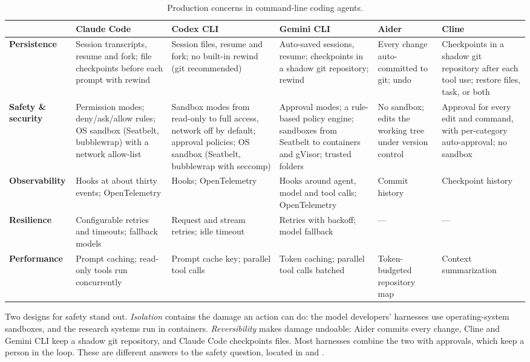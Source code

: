 \begin{table}[t]
\centering
\scriptsize
\setlength{\tabcolsep}{3pt}
\renewcommand{\arraystretch}{1.15}
\caption{Production concerns in command-line coding agents.}
\label{tab:concerns-cli}
\begin{tabularx}{\linewidth}{@{}>{\bfseries}p{1.95cm}YYYYY@{}}
\toprule
& Claude Code & Codex CLI & Gemini CLI & Aider & Cline \\
\midrule
Persistence & Session transcripts, resume and fork; file checkpoints before each prompt with rewind & Session files, resume and fork; no built-in rewind (git recommended) & Auto-saved sessions, resume; checkpoints in a shadow git repository; rewind & Every change auto-committed to git; undo & Checkpoints in a shadow git repository after each tool use; restore files, task, or both \\
Safety \& security & Permission modes; deny/ask/allow rules; OS sandbox (Seatbelt, bubblewrap) with a network allow-list & Sandbox modes from read-only to full access, network off by default; approval policies; OS sandbox (Seatbelt, bubblewrap with seccomp) & Approval modes; a rule-based policy engine; sandboxes from Seatbelt to containers and gVisor; trusted folders & No sandbox; edits the working tree under version control & Approval for every edit and command, with per-category auto-approval; no sandbox \\
Observability & Hooks at about thirty events; OpenTelemetry & Hooks; OpenTelemetry & Hooks around agent, model and tool calls; OpenTelemetry & Commit history & Checkpoint history \\
Resilience & Configurable retries and timeouts; fallback models & Request and stream retries; idle timeout & Retries with backoff; model fallback & --- & --- \\
Performance & Prompt caching; read-only tools run concurrently & Prompt cache key; parallel tool calls & Token caching; parallel tool calls batched & Token-budgeted repository map & Context summarization \\
\bottomrule
\end{tabularx}
\end{table}

Two designs for safety stand out. \emph{Isolation} contains the damage an action can do: the model developers' harnesses use operating-system sandboxes, and the research systems run in containers. \emph{Reversibility} makes damage undoable: Aider commits every change, Cline and Gemini CLI keep a shadow git repository, and Claude Code checkpoints files. Most harnesses combine the two with approvals, which keep a person in the loop. These are different answers to the safety question, located in  and .

